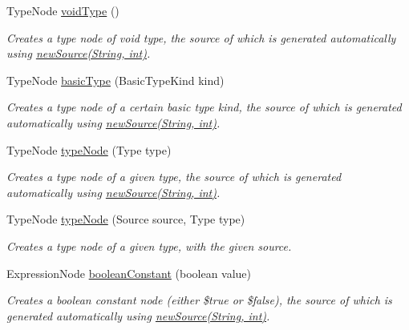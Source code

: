 \begin{DoxyCompactItemize}
Type\+Node \hyperlink{classedu_1_1udel_1_1cis_1_1vsl_1_1civl_1_1transform_1_1common_1_1BaseWorker_ad9fc6e7ce22c949cf68b8352a6de6a8c}{void\+Type} ()
\begin{DoxyCompactList}\small\item\em Creates a type node of void type, the source of which is generated automatically using \hyperlink{classedu_1_1udel_1_1cis_1_1vsl_1_1civl_1_1transform_1_1common_1_1BaseWorker_a45d64b7e09a96de3fe161198a0ad8f5a}{new\+Source(\+String, int)}. \end{DoxyCompactList}\item 
Type\+Node \hyperlink{classedu_1_1udel_1_1cis_1_1vsl_1_1civl_1_1transform_1_1common_1_1BaseWorker_a1a68b5a63251d13e6a14a63497de6ceb}{basic\+Type} (Basic\+Type\+Kind kind)
\begin{DoxyCompactList}\small\item\em Creates a type node of a certain basic type kind, the source of which is generated automatically using \hyperlink{classedu_1_1udel_1_1cis_1_1vsl_1_1civl_1_1transform_1_1common_1_1BaseWorker_a45d64b7e09a96de3fe161198a0ad8f5a}{new\+Source(\+String, int)}. \end{DoxyCompactList}\item 
Type\+Node \hyperlink{classedu_1_1udel_1_1cis_1_1vsl_1_1civl_1_1transform_1_1common_1_1BaseWorker_a3e41fcfa006f5287dfe10570a22a8e4f}{type\+Node} (Type type)
\begin{DoxyCompactList}\small\item\em Creates a type node of a given type, the source of which is generated automatically using \hyperlink{classedu_1_1udel_1_1cis_1_1vsl_1_1civl_1_1transform_1_1common_1_1BaseWorker_a45d64b7e09a96de3fe161198a0ad8f5a}{new\+Source(\+String, int)}. \end{DoxyCompactList}\item 
Type\+Node \hyperlink{classedu_1_1udel_1_1cis_1_1vsl_1_1civl_1_1transform_1_1common_1_1BaseWorker_a1d37624cd75e890bc98a570ea1662045}{type\+Node} (Source source, Type type)
\begin{DoxyCompactList}\small\item\em Creates a type node of a given type, with the given source. \end{DoxyCompactList}\item 
Expression\+Node \hyperlink{classedu_1_1udel_1_1cis_1_1vsl_1_1civl_1_1transform_1_1common_1_1BaseWorker_a0f604b0aa676663d51f870e705f6f025}{boolean\+Constant} (boolean value)
\begin{DoxyCompactList}\small\item\em Creates a boolean constant node (either {\ttfamily \$true} or {\ttfamily \$false}), the source of which is generated automatically using \hyperlink{classedu_1_1udel_1_1cis_1_1vsl_1_1civl_1_1transform_1_1common_1_1BaseWorker_a45d64b7e09a96de3fe161198a0ad8f5a}{new\+Source(\+String, int)}. \end{DoxyCompactList}\item 

\end{DoxyCompactItemize}
